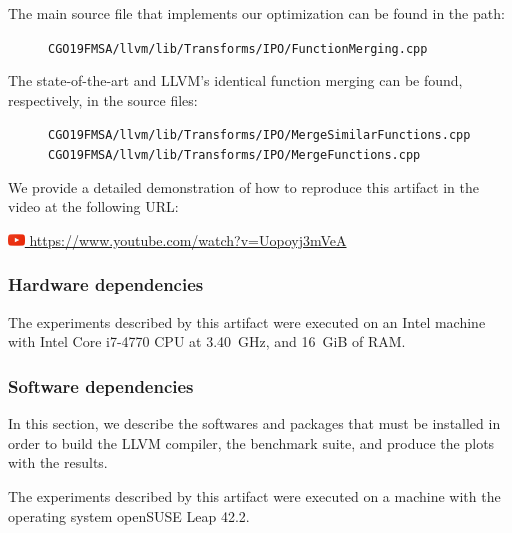 \documentclass{sigplanconf}
\begin{document}
{\begin{itemize}
\end{itemize}

The main source file that implements our optimization can be found in the path:
\begin{figure}[h]
\small \texttt{CGO19FMSA/llvm/lib/Transforms/IPO/FunctionMerging.cpp}
\end{figure}

The state-of-the-art and LLVM's identical function merging can be found,
respectively, in the source files:
\begin{figure}[h]
\small \texttt{CGO19FMSA/llvm/lib/Transforms/IPO/MergeSimilarFunctions.cpp}
\small \texttt{CGO19FMSA/llvm/lib/Transforms/IPO/MergeFunctions.cpp}
\end{figure}

We provide a detailed demonstration of how to reproduce this artifact in the video at the following URL:

\href{https://www.youtube.com/watch?v=Uopoyj3mVeA}{\includegraphics[width=1.2em]{figs/youtube.png} https://www.youtube.com/watch?v=Uopoyj3mVeA}


\subsubsection{Hardware dependencies}


The experiments described by this artifact were executed on an Intel machine
with Intel Core i7-4770 CPU at 3.40~GHz, and 16~GiB of RAM.


\subsubsection{Software dependencies}

In this section, we describe the softwares and packages that must be installed 
in order to build the LLVM compiler, the benchmark suite, and produce the plots with the results.

The experiments described by this artifact were executed on a machine
with the operating system openSUSE Leap 42.2.

}
\end{document}

